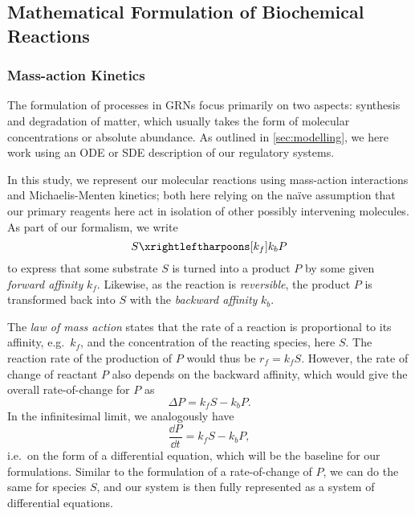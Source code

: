\subsection[Mathematical Formulation]{Mathematical Formulation of Biochemical
  Reactions}
\label{sec:mathematical_form}

\subsubsection[Mass-action Kinetics]{Mass-action Kinetics}
\label{sec:mass_action}
The formulation of processes in GRNs focus primarily on two aspects: synthesis
and degradation of matter, which usually takes the form of molecular
concentrations or absolute abundance. As outlined in \cref{sec:modelling}, we
here work using an ODE or SDE description of  
our regulatory systems. 

In this study, we represent our molecular reactions using mass-action
interactions and Michaelis-Menten kinetics; both here relying on the na\"ive
assumption that our primary reagents here act in isolation of other possibly
intervening molecules. As part of our formalism, we write
\begin{equation}
  S \xrightleftharpoons[k_{f}]{k_{b}} P
  \label{eq:simple_reac}
\end{equation}
to express that some substrate $S$ is turned into a product $P$ by some given
\textit{forward affinity} $k_f$. Likewise, as the reaction is \textit{reversible}, the
product $P$ is transformed back into $S$ with the \textit{backward affinity}
$k_b$. 

The \textit{law of mass action} states that the rate of a reaction
is proportional to its affinity, e.g.\ $k_f$, and the concentration of the
reacting species, here $S$. The reaction rate of the production of $P$ would thus be
$r_f = k_f S$. However, the rate of change of reactant $P$ also depends
on the backward affinity, which would give the overall rate-of-change for $P$ as
\begin{equation}
  \Delta P = k_f S - k_b P.
  \label{eq:mass_action_noninf}
\end{equation}
In the infinitesimal limit, we analogously have 
\begin{equation}
  \frac{\dd P}{\dd t} = k_f S - k_b P,
  \label{eq:mass_action_inf}
\end{equation}
i.e.\ on the form of a differential equation, which will be the baseline for our
formulations. Similar to the formulation of a rate-of-change of $P$, we can do the
same for species $S$, and our system is then fully represented as a system of
differential equations.

